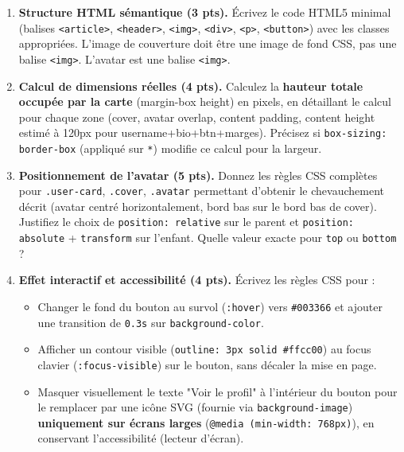 \documentclass[11pt]{article}
\begin{document}
\begin{exercice}
\begin{enumerate}
\item \textbf{Structure HTML sémantique (3 pts).} Écrivez le code HTML5 minimal (balises \texttt{<article>}, \texttt{<header>}, \texttt{<img>}, \texttt{<div>}, \texttt{<p>}, \texttt{<button>}) avec les classes appropriées. L'image de couverture doit être une image de fond CSS, pas une balise \texttt{<img>}. L'avatar est une balise \texttt{<img>}.
\item \textbf{Calcul de dimensions réelles (4 pts).} Calculez la \textbf{hauteur totale occupée par la carte} (margin-box height) en pixels, en détaillant le calcul pour chaque zone (cover, avatar overlap, content padding, content height estimé à 120px pour username+bio+btn+marges). Précisez si \texttt{box-sizing: border-box} (appliqué sur \texttt{*}) modifie ce calcul pour la largeur.
\item \textbf{Positionnement de l'avatar (5 pts).} Donnez les règles CSS complètes pour \texttt{.user-card}, \texttt{.cover}, \texttt{.avatar} permettant d'obtenir le chevauchement décrit (avatar centré horizontalement, bord bas sur le bord bas de cover). Justifiez le choix de \texttt{position: relative} sur le parent et \texttt{position: absolute} + \texttt{transform} sur l'enfant. Quelle valeur exacte pour \texttt{top} ou \texttt{bottom} ?
\item \textbf{Effet interactif et accessibilité (4 pts).} Écrivez les règles CSS pour :
\begin{itemize}
          \item Changer le fond du bouton au survol (\texttt{:hover}) vers \texttt{\#003366} et ajouter une transition de \texttt{0.3s} sur \texttt{background-color}.
          \item Afficher un contour visible (\texttt{outline: 3px solid \#ffcc00}) au focus clavier (\texttt{:focus-visible}) sur le bouton, sans décaler la mise en page.
          \item Masquer visuellement le texte "Voir le profil" à l'intérieur du bouton pour le remplacer par une icône SVG (fournie via \texttt{background-image}) \textbf{uniquement sur écrans larges} (\texttt{@media (min-width: 768px)}), en conservant l'accessibilité (lecteur d'écran).
      \end{itemize}
\end{enumerate}
\end{exercice}
\end{document}

